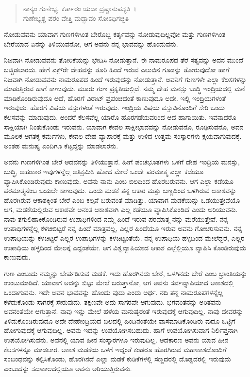 \begin{verse}
ನಾನ್ಯಂ ಗುಣೇಭ್ಯಃ ಕರ್ತಾರಂ ಯದಾ ದ್ರಷ್ಟಾನುಪಶ್ಯತಿ~।\\ಗುಣೇಭ್ಯಶ್ಚ ಪರಂ ವೇತ್ತಿ ಮದ್ಭಾವಂ ಸೋಽಧಿಗಚ್ಛತಿ 
\end{verse}

{\small ನೋಡುವವನು ಯಾವಾಗ ಗುಣಗಳಿಗಿಂತ ಬೇರೊಬ್ಬ ಕರ್ತೃವನ್ನು ನೋಡುವುದಿಲ್ಲವೋ ಮತ್ತು ಗುಣಗಳಿಗಿಂತ ಬೇರೆಯಾದ ಏನನ್ನು ತಿಳಿಯುವನೋ, ಆಗ ಅವನು ನನ್ನ ಭಾವವನ್ನು ಹೊಂದುವನು.}

ನಿಜವಾಗಿ ನೋಡುವವನು ತೋರಿಕೆಯನ್ನು ಭೇದಿಸಿ ನೋಡುತ್ತಾನೆ. ಈ ನಾಮರೂಪದ ತೆರೆ ಸತ್ಯವನ್ನು ಅವನ ಮುಂದೆ ಬಚ್ಚಿಡಲಾರದು. ಹೇಗೆ ಎಕ್ಸ್​ರೇ ದೇಹವನ್ನು ತೂರಿ ಹಿಂದೆ ಇರುವ ಎಲುಬಿನ ಗೂಡನ್ನು ತೋರುವುದೋ ಹಾಗೆ ನಿಜವಾಗಿ ನೋಡುವವನು ನಾಮರೂಪದ ಹಿಂದೆ ಇರುವುದನ್ನು ನೋಡುತ್ತಾನೆ. ಅವನಿಗೆ ಗುಣಗಳೇ ಎಲ್ಲಾ ಕೆಲಸಗಳನ್ನು ಮಾಡುತ್ತಿರುವ ಹಾಗೆ ಕಾಣುವುದು. ಮೂರು ಗುಣ ಪ್ರಕೃತಿಯಲ್ಲಿದೆ. ನಮ್ಮ ದೇಹ ಮನಸ್ಸು ಬುದ್ಧಿ ಇಂದ್ರಿಯದಲ್ಲಿ ಮನೆ ಮಾಡಿಕೊಂಡಿರುವುದೂ ಅದೆ, ಹೊರಗೆ ವಿರಾಟ್ ಪ್ರಪಂಚದಂತೆ ಕಾಣುವುದೂ ಅದೇ. ಇಲ್ಲಿ ಇಂದ್ರಿಯಗಳಂತೆ ಇರುವುದು. ಹೊರಗೆ ವಿಷಯ ವಸ್ತುಗಳಂತೆ ಇರುವುದು. ಇಂದ್ರಿಯ ವಿಷಯ ವಸ್ತುವಿನೊಂದಿಗೆ ಸೇರಿ ಒಂದು ಕೆಲಸವನ್ನು ಮಾಡುವುದು. ಅಂದರೆ ಕೆಲಸವೆಲ್ಲ ಯಾರೊ ಹೊರಗಡೆಯವರಿಂದ ಆದ ಹಾಗಾಯಿತು. ಇವನಾದರೊ ಸಾಕ್ಷಿಯಾಗಿ ನಿಂತುಕೊಂಡು ಇರುವನು. ಯಾವಾಗ ಕೇವಲ ಸಾಕ್ಷೀಭಾವವನ್ನು ನೋಡುವನೊ, ರೂಢಿಸುವನೊ, ಅವನ ಮೂಲಕ ಆಗತಕ್ಕ ಕರ್ಮಗಳು, ಕೇವಲ ದೇಹ ವ್ಯಾಪಾರಕ್ಕೆ ಮತ್ತು ಉಳಿದ ಉತ್ತಮ ಸಂಸ್ಕಾರಗಳು ಕ್ಷಯವಾಗುವುದಕ್ಕೆ. ಅಂತಹ ಮನುಷ್ಯ ಎಂದಿಗೂ ಕೆಟ್ಟದ್ದನ್ನು ಮಾಡಲಾರನು.

ಅವನು ಗುಣಗಳಿಗಿಂತ ಬೇರೆ ಆದವನನ್ನು ತಿಳಿಯುತ್ತಾನೆ. ಹೀಗೆ ಪಂಚಭೂತಗಳು ಒಳಗೆ ದೇಹ ಇಂದ್ರಿಯ ಮನಸ್ಸು, ಬುದ್ಧಿ, ಅಹಂಕಾರ ಇವುಗಳನ್ನೆಲ್ಲ ಅತಿಕ್ರಮಿಸಿ ಹೋದ ಮೇಲೆ ಒಂದೇ ಪರಮಾತ್ಮ ಎಲ್ಲಾ ಕಡೆಯೂ ವ್ಯಾಪಿಸಿಕೊಂಡಿರುವುದು ಕಾಣುವುದು. ಅವನು ನಾನು ಎಂಬ ಬಿಲದಿಂದ ಹೊರಬರುವನು. ಆಗ ಎಲ್ಲಾ ಕಡೆಯೂ ಪರಮಾತ್ಮನೆಂಬ ಬಯಲೇ ಕಾಣುವುದು. ಒಂದು ಮಡಕೆ ತನ್ನ ಆಕಾರ ಮತ್ತು ಬಣ್ಣದಿಂದ ಒಳಗಿರುವ ಆಕಾಶವನ್ನು ಹೊರಗಿರುವ ಆಕಾಶಕ್ಕಿಂತ ಬೇರೆ ಎಂಬ ಕಲ್ಪನೆ ಬರುವಂತೆ ಮಾಡಿತ್ತು. ಯಾವಾಗ ಮಡಕೆಯನ್ನು ಒಡೆಯುತ್ತೇವೆಯೊ ಆಗ, ಮಡಕೆಯಲ್ಲಿರುವ ಆಕಾಶವೇ ಅನಂತ ಆಕಾಶವಾಗಿ ಎಲ್ಲ ಕಡೆಯೂ ವ್ಯಾಪಿಸಿಕೊಂಡಿದೆ ಎಂದು ಅರಿಯುವನು. ನಾವು ತಗುಲಿಹಾಕಿಕೊಂಡಿರುವ ಉಪಾಧಿಗಳಿಂದ ನಮ್ಮ ಹಿಂದೆ ಇರುವ ಪರಮಾತ್ಮ ನನ್ನು ಮರೆಯುತ್ತೇವೆ. ನನ್ನ ಉಪಾಧಿಗಳನ್ನೆಲ್ಲ ಕಳಚಿಬಿಟ್ಟರೆ ನನ್ನ ಹಿಂದೆ ಮಾತ್ರವಲ್ಲ, ಎಲ್ಲರ ಹಿಂದೆಯೂ ಇರುವ ಅವನು ಗೋಚರಿಸುವನು. ನನ್ನ ಉಪಾಧಿಯನ್ನು ಕಳಚಿಟ್ಟರೆ ಎಲ್ಲರ ಉಪಾಧಿಗಳನ್ನು ಕಳಚಿಟ್ಟಂತೆಯೆ. ನನ್ನ ಉಪಾಧಿಯ ಹಳ್ಳದಿಂದ ಮೇಲೆದ್ದರೆ, ಎಲ್ಲರ ಉಪಾಧಿಯ ಹಳ್ಳದಿಂದ ಮೇಲಕ್ಕೆ ಎದ್ದಂತೆಯೇ. ಆಗ ವಿಶ್ವವ್ಯಾಪಿಯಾದ ಆಕಾಶ ಎಲ್ಲೆಲ್ಲಿಯೂ ವ್ಯಾಪಿಸಿ ಕೊಂಡಿರುವುದು ಕಾಣುವುದು.

ಗುಣ ಎಂಬುದು ನಮ್ಮನ್ನು ಬೇರ್ಪಡಿಸುವ ಮಡಕೆ. ಇದು ಹೊರಗಿನದು ಬೇರೆ, ಒಳಗಿನದು ಬೇರೆ ಎಂಬ ಭ್ರಾಂತಿಯನ್ನು ಉಂಟುಮಾಡಿದೆ. ಯಾವಾಗ ಅದನ್ನು ಬಿಟ್ಟು ಮೇಲೆ ಬರುತ್ತಾನೋ, ಆಗ ಅವನು ಸರ್ವವ್ಯಾಪಿಯಾದ ಆಕಾಶದಲ್ಲಿ ಒಂದಾಗುವನು. ಇದೇ ಅವನ ಭಾವವನ್ನು ಹೊಂದು ವುದು ಎಂದು ಅರ್ಥ. ನದಿ ತನ್ನ ನಾಮರೂಪಗಳನ್ನೆಲ್ಲ ಕಳೆದುಕೊಂಡು ಸಾಗರಕ್ಕೆ ಸೇರುವುದು. ತಕ್ಷಣವೇ ಅದು ಸಾಗರವೇ ಆಗುವುದು. ಭಗವಂತನನ್ನು ಅರಿತವನು ಅವನಂತೆಯೇ ಆಗುತ್ತಾನೆ. ನಾವು ಇನ್ನು ಮೇಲೆ ಹಳೆಯ ಮನುಷೃರಂತೆ ಇರುವುದಕ್ಕೆ ಆಗುವುದಿಲ್ಲ. ನಾವು ದೇವರನ್ನು ತಿಳಿದುಕೊಂಡಿರುವುದೂ ಅದೇ ದೇಹೇಂದ್ರಿಯದ ಬಿಲದಲ್ಲಿ ಹಿಂದಿನಂತೆಯೇ ವಾಸಮಾಡಿಕೊಂಡಿರು ವುದೂ ಒಟ್ಟಿಗೆ ಹೋಗುವುದಕ್ಕೆ ಆಗುವುದಿಲ್ಲ. ಅವನು ಇದನ್ನು ಉಪಯೋಗಿಸಬಹುದು. ಹಾಗೆ ಉಪಯೋಗಿಸುವಾಗ ನಿರ್ಲಿಪ್ತನಾಗಿ ಉಪಯೋಗಿಸುವನು. ಅವನಲ್ಲಿ ಯಾವ ಹೀನ ಸಂಸ್ಕಾರಗಳೂ ಇರುವುದಿಲ್ಲ. ಆದಕಾರಣ ಅವನು ಯಾವ ಹೀನ ಕೆಲಸಗಳನ್ನೂ ಮಾಡಲಾರ. ಆಕಾಶ ಮಡಕೆಯ ಒಳಗೆ ಇದ್ದಂತೆ ಕಂಡರೂ ಹೊರಗಿರುವ ಮಹಾಕಾಶದೊಂದಿಗೆ ಸಂಬಂಧವನ್ನು ಕಲ್ಪಿಸಿಕೊಂಡು, ಹೊರಗಿನದೆ ಎಲ್ಲಾ ಮಡಕೆ ಕುಡಿಕೆಗಳಲ್ಲಿ ಸಣ್ಣದರಲ್ಲಿ ದೊಡ್ಡದರಲ್ಲಿ ಇರುವುದು ಎಂಬುದನ್ನು ಸದಾಕಾಲದಲ್ಲಿಯೂ ಅವನು ಅರಿಯುತ್ತಿರುವನು.

